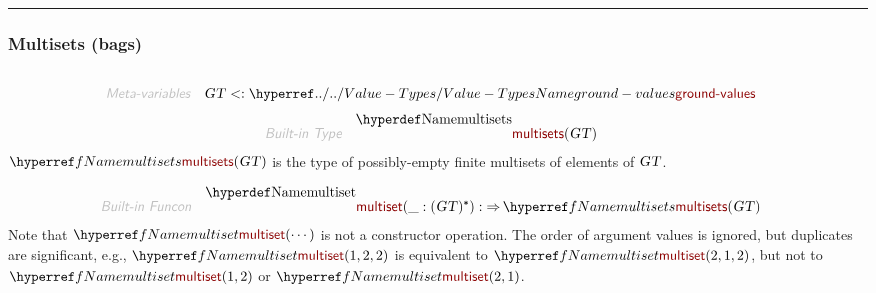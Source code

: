 

\begin{center}
\rule{3in}{0.4pt}
\end{center}

\subsubsection{Multisets (bags)}\hypertarget{multisets-bags}{}\label{multisets-bags}

\begin{align*}
  [ \
  \KEY{Type} \quad & \NAMEREF{multisets} \\
  \KEY{Funcon} \quad & \NAMEREF{multiset} \\
  \KEY{Funcon} \quad & \NAMEREF{multiset-elements} \\
  \KEY{Funcon} \quad & \NAMEREF{multiset-occurrences} \\
  \KEY{Funcon} \quad & \NAMEREF{multiset-insert} \\
  \KEY{Funcon} \quad & \NAMEREF{multiset-delete} \\
  \KEY{Funcon} \quad & \NAMEREF{is-submultiset}
  \ ]
\end{align*}
\begin{align*}
  \KEY{Meta-variables} \quad
  & \VAR{GT} <: \NAMEHYPER{../..}{Value-Types}{ground-values}
\end{align*}
\begin{align*}
  \KEY{Built-in Type} \quad 
  & \NAMEDECL{multisets}(
                       \VAR{GT} )  
\end{align*}
$\SHADE{\NAMEREF{multisets}
           (  \VAR{GT} )}$ is the type of possibly-empty finite multisets of elements
  of $\SHADE{\VAR{GT}}$.

\begin{align*}
  \KEY{Built-in Funcon} \quad
  & \NAMEDECL{multiset}(
                       \_ : (  \VAR{GT} )\STAR) 
    :  \TO \NAMEREF{multisets}
                     (  \VAR{GT} ) 
\end{align*}
Note that $\SHADE{\NAMEREF{multiset}
           (  \cdots )}$ is not a constructor operation. The order of
  argument values is ignored, but duplicates are significant, e.g., 
  $\SHADE{\NAMEREF{multiset}
           (  1, 
                  2, 
                  2 )}$ is equivalent to $\SHADE{\NAMEREF{multiset}
           (  2, 
                  1, 
                  2 )}$, but not to
  $\SHADE{\NAMEREF{multiset}
           (  1, 
                  2 )}$ or $\SHADE{\NAMEREF{multiset}
           (  2, 
                  1 )}$.

